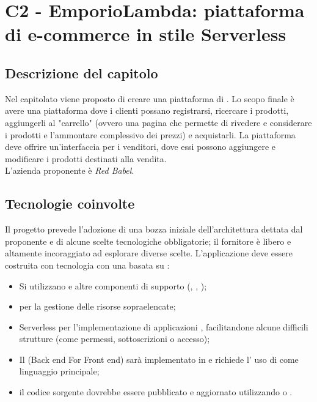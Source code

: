 \section{C2 - EmporioLambda: piattaforma di e-commerce in stile Serverless}

\subsection{Descrizione del capitolo}
Nel capitolato viene proposto di creare una piattaforma di .
Lo scopo finale è avere una piattaforma dove i clienti possano registrarsi, ricercare i prodotti, aggiungerli al "carrello" (ovvero una pagina che permette di rivedere e considerare i prodotti e l'ammontare complessivo dei prezzi) e acquistarli. La piattaforma deve offrire un'interfaccia per i venditori, dove essi possono aggiungere e modificare i prodotti destinati alla vendita.\\
L'azienda proponente è \textit{Red Babel}.

\subsection{Tecnologie coinvolte}
Il progetto prevede l'adozione di una bozza iniziale dell'architettura dettata dal proponente e di alcune scelte tecnologiche obbligatorie; il fornitore è libero e altamente incoraggiato ad esplorare diverse scelte.
L'applicazione deve essere costruita con tecnologia  con una  basata su :
\begin{itemize}
\item	Si utilizzano  e altre componenti di supporto (, , );
\item	{} per la gestione delle risorse sopraelencate;
\item	Serverless  per l'implementazione di applicazioni , facilitandone alcune difficili strutture (come permessi, sottoscrizioni o accesso);
\item	Il (Back end For Front end) sarà implementato in  e richiede l' uso di  come linguaggio principale;
\item	il codice sorgente dovrebbe essere pubblicato e aggiornato utilizzando  o .
\end{itemize}

